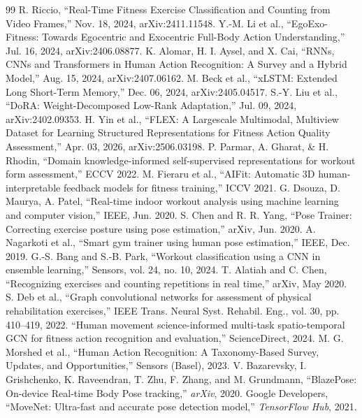 \documentclass[conference,onecolumn,oneside]{IEEEtran}
\begin{document}
\newpage

\begin{thebibliography}{99}
 R. Riccio, ``Real-Time Fitness Exercise Classification and Counting from Video Frames,'' Nov. 18, 2024, arXiv:2411.11548.
 Y.-M. Li et al., ``EgoExo-Fitness: Towards Egocentric and Exocentric Full-Body Action Understanding,'' Jul. 16, 2024, arXiv:2406.08877.
 K. Alomar, H. I. Aysel, and X. Cai, ``RNNs, CNNs and Transformers in Human Action Recognition: A Survey and a Hybrid Model,'' Aug. 15, 2024, arXiv:2407.06162.
 M. Beck et al., ``xLSTM: Extended Long Short-Term Memory,'' Dec. 06, 2024, arXiv:2405.04517.
 S.-Y. Liu et al., ``DoRA: Weight-Decomposed Low-Rank Adaptation,'' Jul. 09, 2024, arXiv:2402.09353.
 H. Yin et al., ``FLEX: A Largescale Multimodal, Multiview Dataset for Learning Structured Representations for Fitness Action Quality Assessment,'' Apr. 03, 2026, arXiv:2506.03198.
 P. Parmar, A. Gharat, \& H. Rhodin, ``Domain knowledge-informed self-supervised representations for workout form assessment,'' ECCV 2022.
 M. Fieraru et al., ``AIFit: Automatic 3D human-interpretable feedback models for fitness training,'' ICCV 2021.
 G. Dsouza, D. Maurya, A. Patel, ``Real-time indoor workout analysis using machine learning and computer vision,'' IEEE, Jun. 2020.
 S. Chen and R. R. Yang, ``Pose Trainer: Correcting exercise posture using pose estimation,'' arXiv, Jun. 2020.
 A. Nagarkoti et al., ``Smart gym trainer using human pose estimation,'' IEEE, Dec. 2019.
 G.-S. Bang and S.-B. Park, ``Workout classification using a CNN in ensemble learning,'' Sensors, vol. 24, no. 10, 2024.
 T. Alatiah and C. Chen, ``Recognizing exercises and counting repetitions in real time,'' arXiv, May 2020.
 S. Deb et al., ``Graph convolutional networks for assessment of physical rehabilitation exercises,'' IEEE Trans. Neural Syst. Rehabil. Eng., vol. 30, pp. 410--419, 2022.
 ``Human movement science-informed multi-task spatio-temporal GCN for fitness action recognition and evaluation,'' ScienceDirect, 2024.
 M. G. Morshed et al., ``Human Action Recognition: A Taxonomy-Based Survey, Updates, and Opportunities,'' Sensors (Basel), 2023.
 V. Bazarevsky, I. Grishchenko, K. Raveendran, T. Zhu, F. Zhang, and M. Grundmann, ``BlazePose: On-device Real-time Body Pose tracking,'' \textit{arXiv}, 2020.
 Google Developers, ``MoveNet: Ultra-fast and accurate pose detection model,'' \textit{TensorFlow Hub}, 2021.

\end{thebibliography}
\end{document}

